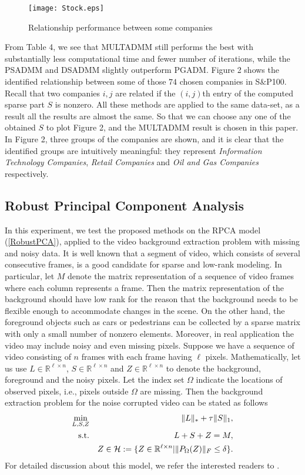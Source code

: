 \documentclass{mcom-l}
\theoremstyle{definition}
\theoremstyle{remark}
\numberwithin{equation}{section}
\begin{document}
\begin{figure}[h]
\centering
\texttt{[image: Stock.eps]}
\caption{Relationship performance between some companies}
\end{figure}

From Table 4, we see that MULTADMM still performs the best with substantially less computational time and fewer number of iterations, while the PSADMM and DSADMM slightly outperform PGADM. Figure 2 shows the identified relationship between some of those $74$ chosen companies in S$\&$P100. Recall that two companies $i,j$ are related if the $(i,j)$th entry of the computed sparse part $S$ is nonzero. All these methods are applied to the same data-set, as a result all the results are almost the same. So that we can choose any one of the obtained $S$ to plot Figure 2, and the MULTADMM result is chosen in this paper. In Figure 2, three groups of the companies are shown, and it is clear that the identified groups are intuitively meaningful: they represent {\em{Information Technology Companies}}, {\em{Retail Companies}} and {\em{Oil and Gas Companies}} respectively.

\subsection{Robust Principal Component Analysis}

In this experiment, we test the proposed methods on the RPCA model (\ref{RobustPCA}), applied to the video background extraction problem with missing and noisy data. It is well known that a segment of video, which consists of several consecutive frames, is a good candidate for sparse and low-rank modeling. In particular, let $M$ denote the matrix representation of a sequence of video frames where each column represents a frame. Then the matrix representation of the background should have low rank for the reason that the background needs to be flexible enough to accommodate changes in the scene. On the other hand, the foreground objects such as cars or pedestrians can be collected by a sparse matrix with only a small number of nonzero elements.
Moreover, in real application the video may include noisy and even missing pixels. Suppose we have a sequence of video
consisting of $n$ frames with each frame having $\ell$ pixels. Mathematically, let us use $L\in \mathbb{R}^{\ell\times n}$, $S\in \mathbb{R}^{\ell\times n}$ and $Z\in \mathbb{R}^{\ell\times n}$ to denote the background, foreground and the noisy pixels. Let the index set $\Omega$ indicate the locations of observed pixels, i.e., pixels outside $\Omega$ are missing. Then the background extraction problem for the noise corrupted video can be stated as follows
\begin{eqnarray}
\min_{L,S,Z} && \|L\|_* + \tau \|S\|_1,\label{problemRPCAVideo}\\
\hbox{s.t.} && L + S + Z = M,\nonumber\\
&&Z\in {\mathcal{H}}:=\{Z\in \mathbb{R}^{\ell\times n}|\|P_{\Omega}(Z)\|_F\le \delta\}.\nonumber
\end{eqnarray}
For detailed discussion about this model, we refer the interested readers to \cite{CandesRPCA2011}.
\end{document}
